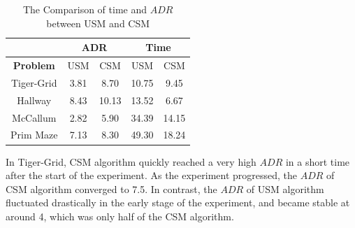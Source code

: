 \documentclass[conference]{IEEEtran}
\begin{document}
%	
	\begin{table}[b]
		\caption{The Comparison of time and $ADR$ between USM and CSM}
		\begin{center}
			\begin{tabular}{|c|c|c|c|c|}
				\hline
				&\multicolumn{2}{|c|}{\textbf{ADR}} &\multicolumn{2}{|c|}{\textbf{Time}} \\
				\hline
				\textbf{Problem}      & USM         & CSM               &USM           & CSM      \\
				\hline
				Tiger-Grid    & 3.81        & 8.70              & 10.75        & 9.45     \\ 
				Hallway       & 8.43        & 10.13             & 13.52        & 6.67     \\ 
				McCallum      & 2.82        & 5.90              & 34.39        & 14.15    \\ 
				Prim Maze     & 7.13        & 8.30              & 49.30        & 18.24    \\ 
				\hline
			\end{tabular}
			
			\label{table:results}
		\end{center}
	\end{table}
	
	
	
	In Tiger-Grid, CSM algorithm quickly reached a very high $ADR$ in a short
	time after the start of the experiment. As the experiment progressed, the $ADR$ of
	CSM algorithm converged to 7.5. In contrast, the $ADR$ of USM algorithm fluctuated
	drastically in the early stage of the experiment, and became stable at around 4, which
	was only half of the CSM algorithm.
	
\end{document}
